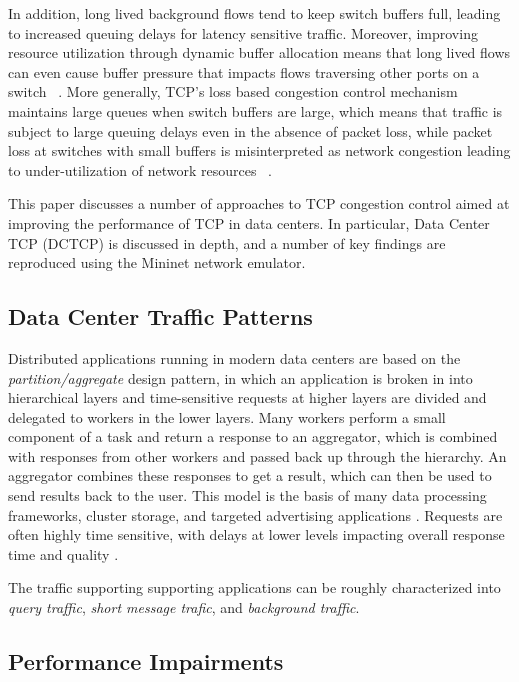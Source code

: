 In addition, long lived background flows tend to keep switch buffers full, leading to increased queuing delays for latency sensitive traffic. Moreover, improving resource utilization through dynamic buffer allocation means that long lived flows can even cause buffer pressure that impacts flows traversing other ports on a switch ~\cite{alizadeh_data_2010}. More generally, TCP's loss based congestion control mechanism maintains large queues when switch buffers are large, which means that traffic is subject to large queuing delays even in the absence of packet loss, while packet loss at switches with small buffers is misinterpreted as network congestion leading to under-utilization of network resources ~\cite{cardwell_bbr:_2016}.

This paper discusses a number of approaches to TCP congestion control aimed at improving the performance of TCP in data centers. In particular, Data Center TCP (DCTCP) is discussed in depth, and a number of key findings are reproduced using the Mininet network emulator.

\subsection{Data Center Traffic Patterns}

Distributed applications running in modern data centers are based on the \emph{partition/aggregate} design pattern, in which an application is broken in into hierarchical layers and time-sensitive requests at higher layers are divided and delegated to workers in the lower layers. Many workers perform a small component of a task and return a response to an aggregator, which is combined with responses from other workers and passed back up through the hierarchy. An aggregator combines these responses to get a result, which can then be used to send results back to the user. This model is the basis of many data processing frameworks, cluster storage, and targeted advertising applications \cite{chen_understanding_2009, dean_mapreduce:_2004, alizadeh_data_2010}. Requests are often highly time sensitive, with delays at lower levels impacting overall response time and quality \cite{alizadeh_data_2010}.

The traffic supporting supporting applications can be roughly characterized into \emph{query traffic}, \emph{short message trafic}, and \emph{background traffic}.

\subsection{Performance Impairments}

